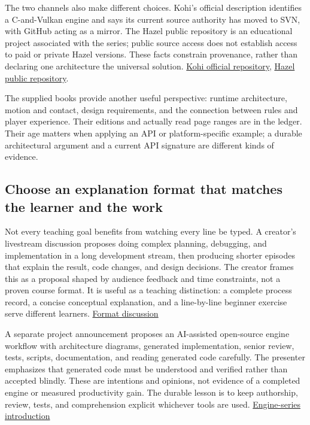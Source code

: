 The two channels also make different choices. Kohi's official description identifies a C-and-Vulkan engine and says its current source authority has moved to SVN, with GitHub acting as a mirror. The Hazel public repository is an educational project associated with the series; public source access does not establish access to paid or private Hazel versions. These facts constrain provenance, rather than declaring one architecture the universal solution. \href{https://github.com/travisvroman/kohi}{Kohi official repository}, \href{https://github.com/TheCherno/Hazel}{Hazel public repository}.

The supplied books provide another useful perspective: runtime architecture, motion and contact, design requirements, and the connection between rules and player experience. Their editions and actually read page ranges are in the ledger. Their age matters when applying an API or platform-specific example; a durable architectural argument and a current API signature are different kinds of evidence.

\subsection{Choose an explanation format that matches the learner and the work}\label{05-engine-i-ch008-choose-an-explanation-format-that-matches-the-learner-and-the-work}

Not every teaching goal benefits from watching every line be typed. A creator's livestream discussion proposes doing complex planning, debugging, and implementation in a long development stream, then producing shorter episodes that explain the result, code changes, and design decisions. The creator frames this as a proposal shaped by audience feedback and time constraints, not a proven course format. It is useful as a teaching distinction: a complete process record, a concise conceptual explanation, and a line-by-line beginner exercise serve different learners. \href{https://www.youtube.com/watch?v=lwDdMYzUnxs&t=8m2s}{Format discussion}

A separate project announcement proposes an AI-assisted open-source engine workflow with architecture diagrams, generated implementation, senior review, tests, scripts, documentation, and reading generated code carefully. The presenter emphasizes that generated code must be understood and verified rather than accepted blindly. These are intentions and opinions, not evidence of a completed engine or measured productivity gain. The durable lesson is to keep authorship, review, tests, and comprehension explicit whichever tools are used. \href{https://www.youtube.com/watch?v=-paLdjChPxo&t=8m32s}{Engine-series introduction}

